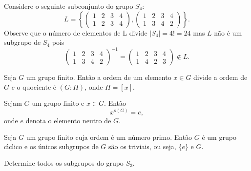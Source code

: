 \documentclass{beamer}
\begin{document}
    \begin{frame}
        \begin{observacao}
            Considere o seguinte subconjunto do grupo $S_4$:
            \[
                L = \left\{\begin{pmatrix}
                    1 & 2 & 3 & 4\\
                    1 & 2 & 3 & 4
                \end{pmatrix}, \begin{pmatrix}
                    1 & 2 & 3 & 4\\
                    1 & 3 & 4 & 2
                \end{pmatrix}\right\}.
            \]
            Observe que o n\'umero de elementos de L divide $|S_4| = 4! = 24$ mas $L$ n\~ao \'e um subgrupo de $S_4$ pois
            \[
                \begin{pmatrix}
                    1 & 2 & 3 & 4\\
                    1 & 3 & 4 & 2
                \end{pmatrix}^{-1} = \begin{pmatrix}
                    1 & 2 & 3 & 4\\
                    1 & 4 & 2 & 3
                \end{pmatrix} \notin L.
            \]
        \end{observacao}
    \end{frame}

    \begin{frame}
        \begin{corolario}
            Seja $G$ um grupo finito. Ent\~ao a ordem de um elemento $x \in G$ divide a ordem de $G$ e o quociente \'e $(G : H)$, onde $H = [x]$.
        \end{corolario}
    \end{frame}

    \begin{frame}
        \begin{corolario}
            Sejam $G$ um grupo finito e $x \in G$. Ent\~ao
            \[
                x^{o(G)} = e,
            \]
            onde $e$ denota o elemento neutro de $G$.
        \end{corolario}
    \end{frame}

    \begin{frame}
        \begin{corolario}
            Seja $G$ um grupo finito cuja ordem \'e um n\'umero primo. Ent\~ao $G$ \'e um grupo c{\'\i}clico e os \'unicos subgrupos de $G$ s\~ao os triviais, ou seja, $\{e\}$ e $G$.
        \end{corolario}
    \end{frame}

    \begin{frame}
        \begin{exemplo}
            Determine todos os subgrupos do grupo $S_3$.
        \end{exemplo}
    \end{frame}
\end{document}
